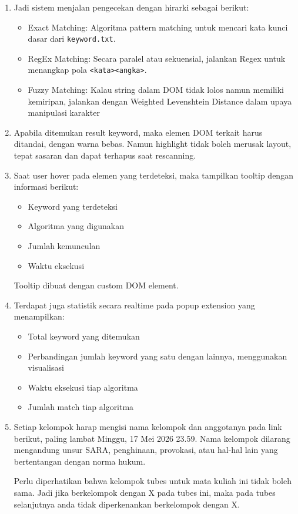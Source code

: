 \begin{enumerate}
    \item Jadi sistem menjalan pengecekan dengan hirarki sebagai berikut:
          \begin{itemize}
              \item Exact Matching: Algoritma pattern matching untuk mencari kata kunci dasar dari \texttt{keyword.txt}.
              \item RegEx Matching: Secara paralel atau sekuensial, jalankan Regex untuk menangkap pola \texttt{<kata><angka>}.
              \item Fuzzy Matching: Kalau string dalam DOM tidak lolos namun memiliki kemiripan, jalankan dengan Weighted Levenshtein Distance dalam upaya manipulasi karakter
          \end{itemize}
    \item Apabila ditemukan result keyword, maka elemen DOM terkait harus ditandai, dengan warna bebas. Namun highlight tidak boleh merusak layout, tepat sasaran dan dapat terhapus saat rescanning.
    \item Saat user hover pada elemen yang terdeteksi, maka tampilkan tooltip dengan informasi berikut:
          \begin{itemize}
              \item Keyword yang terdeteksi
              \item Algoritma yang digunakan
              \item Jumlah kemunculan
              \item Waktu eksekusi
          \end{itemize}
          Tooltip dibuat dengan custom DOM element.
    \item Terdapat juga statistik secara realtime pada popup extension yang menampilkan:
          \begin{itemize}
              \item Total keyword yang ditemukan
              \item Perbandingan jumlah keyword yang satu dengan lainnya, menggunakan visualisasi
              \item Waktu eksekusi tiap algoritma
              \item Jumlah match tiap algoritma
          \end{itemize}
    \item Setiap kelompok harap mengisi nama kelompok dan anggotanya pada link berikut, paling lambat Minggu, 17 Mei 2026 23.59. Nama kelompok dilarang mengandung unsur SARA, penghinaan, provokasi, atau hal-hal lain yang bertentangan dengan norma hukum.

          Perlu diperhatikan bahwa kelompok tubes untuk mata kuliah ini tidak boleh sama. Jadi jika berkelompok dengan X pada tubes ini, maka pada tubes selanjutnya anda tidak diperkenankan berkelompok dengan X.

\end{enumerate}

